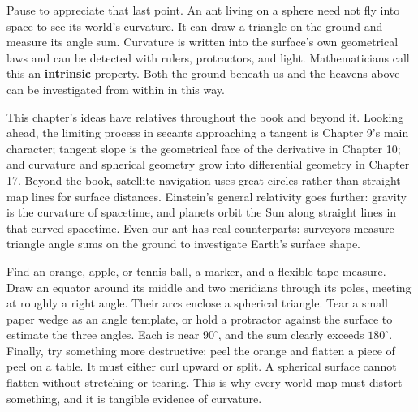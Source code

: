 Pause to appreciate that last point. An ant living on a sphere need not fly into space to see its world's curvature. It can draw a triangle on the ground and measure its angle sum. Curvature is written into the surface's own geometrical laws and can be detected with rulers, protractors, and light. Mathematicians call this an \textbf{intrinsic} property. Both the ground beneath us and the heavens above can be investigated from within in this way.

\begin{lianjie}
This chapter's ideas have relatives throughout the book and beyond it. Looking ahead, the limiting process in secants approaching a tangent is Chapter 9's main character; tangent slope is the geometrical face of the derivative in Chapter 10; and curvature and spherical geometry grow into differential geometry in Chapter 17. Beyond the book, satellite navigation uses great circles rather than straight map lines for surface distances. Einstein's general relativity goes further: gravity is the curvature of spacetime, and planets orbit the Sun along straight lines in that curved spacetime. Even our ant has real counterparts: surveyors measure triangle angle sums on the ground to investigate Earth's surface shape.
\end{lianjie}

\begin{shiyan}
Find an orange, apple, or tennis ball, a marker, and a flexible tape measure. Draw an equator around its middle and two meridians through its poles, meeting at roughly a right angle. Their arcs enclose a spherical triangle. Tear a small paper wedge as an angle template, or hold a protractor against the surface to estimate the three angles. Each is near $90^\circ$, and the sum clearly exceeds $180^\circ$. Finally, try something more destructive: peel the orange and flatten a piece of peel on a table. It must either curl upward or split. A spherical surface cannot flatten without stretching or tearing. This is why every world map must distort something, and it is tangible evidence of curvature.
\end{shiyan}

